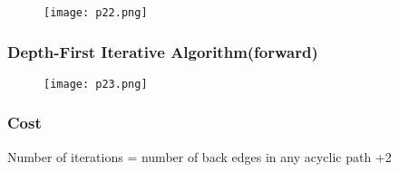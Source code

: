 \begin{figure}[h]
    \centering
    \texttt{[image: p22.png]}
    \caption{}
    \label{fig:p22}
\end{figure}


\subsubsection{Depth-First Iterative Algorithm(forward)
}



\begin{figure}[h]
    \centering
    \texttt{[image: p23.png]}
    \caption{}
    \label{fig:p23}
\end{figure}


\subsubsection{Cost}

Number of iterations = number of back edges in any acyclic path +2 




